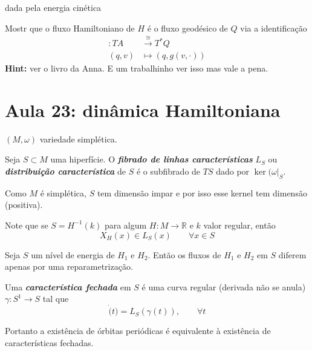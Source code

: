 \begin{enumerate}
	dada pela energia cinética

\begin{exercise}\leavevmode
	Mostr que o fluxo Hamiltoniano de $H$ é o fluxo geodésico de $Q$ via a identificação
	\begin{align*}
		: TA &\overset{\cong }{\longrightarrow} T^*Q \\
		(q,v)&\longmapsto (q,g(v,\cdot ))
	\end{align*}
	\textbf{Hint:} ver o livro da Anna. E um trabalhinho ver isso mas vale a pena.
	
\end{exercise}
\end{enumerate}

\section{Aula 23: dinâmica Hamiltoniana}

$(M,\omega)$ variedade simplética.

\begin{defn}\leavevmode
	Seja $S\subset M$ uma hiperfície. O  \textit{\textbf{fibrado de linhas características}} $L_S$ ou \textit{\textbf{distribuição característica}} de $S$ é o subfibrado de $TS$ dado por $\ker(\omega|_{S}$.
\end{defn}

\begin{remark}\leavevmode
	Como $M$ é simplética, $S$ tem dimensão impar e por isso esse kernel tem dimensão (positiva).
\end{remark}

Note que se $S=H^{-1}(k)$ para algum $H:M\to\mathbb{R}$ e  $k$ valor regular, então
\[X_H(x)\in L_S(x)\qquad \forall x\in S\]

\begin{prop}\leavevmode
	Seja $S$ um nível de energia de $H_1$ e $H_2$. Então os fluxos de $H_1$ e $H_2$ em $S$ diferem apenas por uma reparametrização.
\end{prop}

\begin{defn}\leavevmode
	Uma \textit{\textbf{característica fechada}} em $S$ é uma curva regular (derivada não se anula) $\gamma:S^1\to S$ tal que 
	\[ \dot(t)=L_S(\gamma(t)),\qquad \forall t\]
\end{defn}

Portanto a existência de órbitas periódicas é equivalente à existência de características fechadas.

